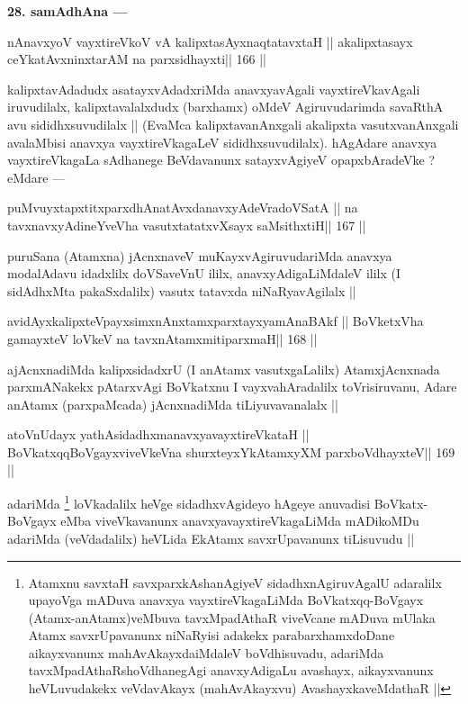 \begin{artha}
{\bf 28. samAdhAna ---}
\end{artha}

\begin{shl}
nAnavxyoV vayxtireVkoV vA kalipxtasAyxnaqtatavxtaH ||
akalipxtasayx ceYkatAvxninxtarAM na parxsidhayxti\hfill || 166 ||
\end{shl}

\begin{artha}
kalipxtavAdadudx asatayxvAdadxriMda anavxyavAgali vayxtireVkavAgali iruvudilalx, kalipxtavalalxdudx (barxhamx) oMdeV Agiruvudarimda savaRthA avu sididhxsuvudilalx || (EvaMca kalipxtavanAnxgali akalipxta vasutxvanAnxgali avalaMbisi anavxya vayxtireVkagaLeV sididhxsuvudilalx). hAgAdare anavxya vayxtireVkagaLa sAdhanege BeVdavanunx satayxvAgiyeV opapxbAradeVke ? eMdare ---
\end{artha}

\begin{shl}
puMvuyxtapxtitxparxdhAnatAvxdanavxyAdeVradoVSatA ||
na tavxnavxyAdineYveVha vasutxtatatxvXsayx saMsithxtiH\hfill || 167 ||
\end{shl}

\begin{artha}
puruSana (Atamxna) jAcnxnaveV muKayxvAgiruvudariMda anavxya modalAdavu idadxlilx doVSaveVnU ililx, anavxyAdigaLiMdaleV ililx (I sidAdhxMta pakaSxdalilx) vasutx tatavxda niNaRyavAgilalx ||
\end{artha}

\begin{shl}
avidAyxkalipxteV\s payxsimxnAnxtamxparxtayxyamAnaBAkf ||
BoVketxVha gamayxteV loVkeV na tavxnAtamxmitiparxmaH\hfill || 168 ||
\end{shl}

\begin{artha}
ajAcnxnadiMda kalipxsidadxrU (I anAtamx vasutxgaLalilx) AtamxjAcnxnada parxmANakekx pAtarxvAgi BoVkatxnu I vayxvahAradalilx toVrisiruvanu, Adare anAtamx (parxpaMcada) jAcnxnadiMda tiLiyuvavanalalx ||
\end{artha}

\begin{shl}
atoV\s nUdayx yathAsidadhxmanavxyavayxtireVkataH ||
BoVkatxqqBoVgayxviveVkeVna shurxteyxYkAtamxyXM parxboVdhayxteV\hfill || 169 ||
\end{shl}

\begin{artha}
adariMda \footnote[10]{Atamxnu savxtaH savxparxkAshanAgiyeV sidadhxnAgiruvAgalU adaralilx upayoVga mADuva anavxya vayxtireVkagaLiMda BoVkatxqq-BoVgayx (Atamx-anAtamx)veMbuva tavxMpadAthaR viveVcane mADuva mUlaka Atamx savxrUpavanunx niNaRyisi adakekx parabarxhamxdoDane aikayxvanunx mahAvAkayxdaiMdaleV boVdhisuvadu, adariMda tavxMpadAthaRshoVdhanegAgi anavxyAdigaLu avashayx, aikayxvanunx heVLuvudakekx veVdavAkayx (mahAvAkayxvu) AvashayxkaveMdathaR ||} loVkadalilx heVge sidadhxvAgideyo hAgeye anuvadisi BoVkatx-BoVgayx eMba viveVkavanunx anavxyavayxtireVkagaLiMda mADikoMDu adariMda (veVdadalilx) heVLida EkAtamx savxrUpavanunx tiLisuvudu ||
\end{artha}

